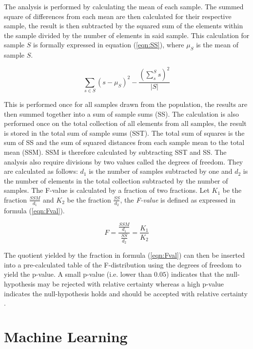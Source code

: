 The analysis is performed by calculating the mean of each sample. The summed square of differences from each mean are then calculated for their respective sample, the result is then subtracted by the squared sum of the elements within the sample divided by the number of elements in said sample. This calculation for sample $S$ is formally expressed in equation (\ref{eqn:SS}), where $\mu_S$ is the mean of sample $S$.

\begin{equation}
\label{eqn:SS}
 \sum_{s \in S} (s - \mu_S)^2 - \frac{(\sum_{s}^{S} s)^2}{|S|} 
\end{equation}

This is performed once for all samples drawn from the population, the results are then summed together into a sum of sample sums (SS). The calculation is also performed once on the total collection of all elements from all samples, the result is stored in the total sum of sample sums (SST). The total sum of squares is the sum of SS and the sum of squared distances from each sample mean to the total mean (SSM). SSM is therefore calculated by subtracting SST and SS. The analysis also require divisions by two values called the degrees of freedom. They are calculated as follows: $d_1$ is the number of samples subtracted by one and $d_2$ is the number of elements in the total collection subtracted by the number of samples. The F-value is calculated by a fraction of two fractions. Let  $K_1$ be the fraction $\frac{SSM}{d_1}$ and $K_2$ be the fraction $\frac{SS}{d_2}$, the \textit{F-value} is defined as expressed in formula (\ref{eqn:Fval}).

\begin{equation}
\label{eqn:Fval}
 F = \frac{\frac{SSM}{d_1}}{\frac{SS}{d_2}} = \frac{K_1}{K_2}
\end{equation}

The quotient yielded by the fraction in formula (\ref{eqn:Fval}) can then be inserted into a pre-calculated table of the F-distribution using the degrees of freedom to yield the p-value. A small p-value (i.e. lower than $0.05$) indicates that the null-hypothesis may be rejected with relative certainty whereas a high p-value indicates the null-hypothesis holds and should be accepted with relative certainty \cite{lowry2014concepts}.


\section{Machine Learning}

